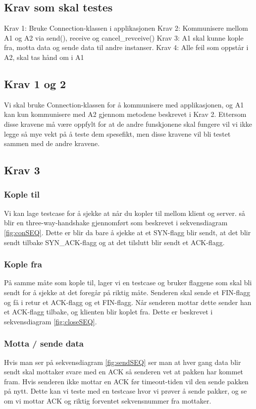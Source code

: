 \subsection{Krav som skal testes}
Krav 1: Bruke Connection-klassen i applikasjonen
Krav 2: Kommunisere mellom A1 og A2 via send(), receive og cancel\_revceive()
Krav 3: A1 skal kunne kople fra, motta data og sende data til andre instanser.
Krav 4: Alle feil som oppstår i A2, skal tas hånd om i A1

\subsection{Krav 1 og 2}
Vi skal bruke Connection-klassen for å kommunisere med applikasjonen, og A1 kan kun kommunisere med A2 gjennom metodene beskrevet i Krav 2. 
Ettersom disse kravene må være oppfylt for at de andre funskjonene skal fungere vil vi ikke legge så mye vekt på å teste dem spesefikt, men disse kravene vil bli testet sammen med de andre kravene.

\subsection{Krav 3}
\subsubsection{Kople til}
Vi kan lage testcase for å sjekke at når du kopler til mellom klient og server. så blir en three-way-handshake gjennomført som beskrevet i sekvensdiagram \ref{fig:conSEQ}. Dette er blir da bare å sjekke at et SYN-flagg blir sendt, at det blir sendt tilbake SYN\_ACK-flagg og at det tilslutt blir sendt et ACK-flagg.

\subsubsection{Kople fra}
På samme måte som kople til, lager vi en testcase og bruker flaggene som skal bli sendt for å sjekke at det foregår på riktig måte. Senderen skal sende et FIN-flagg og få i retur et ACK-flagg og et FIN-flagg. Når senderen mottar dette sender han et ACK-flagg tilbake, og klienten blir koplet fra. Dette er beskrevet i sekvensdiagram \ref{fig:closeSEQ}.

\subsubsection{Motta / sende data}
Hvis man ser på sekvensdiagram \ref{fig:sendSEQ} ser man at hver gang data blir sendt skal mottaker svare med en ACK så senderen vet at pakken har kommet fram. Hvis senderen ikke mottar en ACK før timeout-tiden vil den sende pakken på nytt. Dette kan vi teste med en testcase hvor vi prøver å sende pakker, og se om vi mottar ACK og riktig forventet sekvensnummer fra mottaker.

